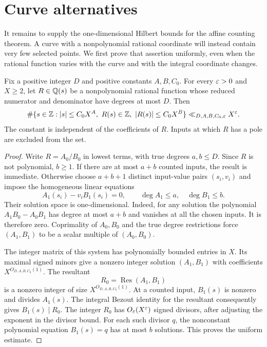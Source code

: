\section{Curve alternatives}
\label{sec:curves}

It remains to supply the one-dimensional Hilbert bounds for the affine
counting theorem.  A curve with a nonpolynomial rational coordinate will
instead contain very few selected points.  We first prove that assertion
uniformly, even when the rational function varies with the curve and
with the integral coordinate changes.

\begin{lemma}\label{lem:rational-values}
Fix a positive integer $D$ and positive constants $A,B,C_0$.
For every $\varepsilon>0$ and $X\ge2$, let $R\in\mathbb Q(s)$ be a nonpolynomial
rational function whose reduced numerator and denominator have degrees
at most $D$.  Then
\[
 \#\{s\in\mathbb Z: |s|\le C_0X^A,\ R(s)\in\mathbb Z,
                         \ |R(s)|\le C_0X^B\}
 \ll_{D,A,B,C_0,\varepsilon}X^\varepsilon.
\]
The constant is independent of the coefficients of $R$.  Inputs at
which $R$ has a pole are excluded from the set.
\end{lemma}

\begin{proof}
Write $R=A_0/B_0$ in lowest terms, with true degrees $a,b\le D$.
Since $R$ is not polynomial, $b\ge1$.  If there are at most $a+b$
counted inputs, the result is immediate.  Otherwise choose $a+b+1$
distinct input-value pairs $(s_i,v_i)$ and impose the homogeneous linear
equations
\[
 A_1(s_i)-v_i B_1(s_i)=0,\qquad
 \deg A_1\le a,\quad \deg B_1\le b.
\]
Their solution space is one-dimensional.  Indeed, for any solution
the polynomial $A_1B_0-A_0B_1$ has degree at most $a+b$ and vanishes
at all the chosen inputs.  It is therefore zero.  Coprimality of
$A_0,B_0$ and the true degree restrictions force
$(A_1,B_1)$ to be a scalar multiple of $(A_0,B_0)$.

The integer matrix of this system has polynomially bounded entries in
$X$.  Its maximal signed minors give a nonzero integer solution
$(A_1,B_1)$ with coefficients $X^{O_{D,A,B,C_0}(1)}$.  The resultant
\[
 R_0=\operatorname{Res}(A_1,B_1)
\]
is a nonzero integer of size $X^{O_{D,A,B,C_0}(1)}$.  At a counted
input, $B_1(s)$ is nonzero and divides $A_1(s)$.  The integral Bezout
identity for the resultant consequently gives $B_1(s)\mid R_0$.
The integer $R_0$ has $O_\varepsilon(X^\varepsilon)$ signed divisors, after adjusting
the exponent in the divisor bound.  For each such divisor $q$, the
nonconstant polynomial equation $B_1(s)=q$ has at most $b$ solutions.
This proves the uniform estimate.
\end{proof}

